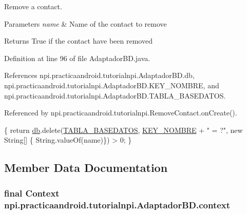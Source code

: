 Remove a contact. 


\begin{DoxyParams}{Parameters}
{\em name} & Name of the contact to remove \\
\hline
\end{DoxyParams}
\begin{DoxyReturn}{Returns}
True if the contact have been removed 
\end{DoxyReturn}


Definition at line 96 of file Adaptador\-B\-D.\-java.



References npi.\-practicaandroid.\-tutorialnpi.\-Adaptador\-B\-D.\-db, npi.\-practicaandroid.\-tutorialnpi.\-Adaptador\-B\-D.\-K\-E\-Y\-\_\-\-N\-O\-M\-B\-R\-E, and npi.\-practicaandroid.\-tutorialnpi.\-Adaptador\-B\-D.\-T\-A\-B\-L\-A\-\_\-\-B\-A\-S\-E\-D\-A\-T\-O\-S.



Referenced by npi.\-practicaandroid.\-tutorialnpi.\-Remove\-Contact.\-on\-Create().


\begin{DoxyCode}
                                                   \{
        \textcolor{keywordflow}{return} \hyperlink{classnpi_1_1practicaandroid_1_1tutorialnpi_1_1_adaptador_b_d_a7bda122c7e3ef7889ebe3f14ee6a6992}{db}.delete(\hyperlink{classnpi_1_1practicaandroid_1_1tutorialnpi_1_1_adaptador_b_d_abbf36d9723f1844372402ae083635e3f}{TABLA\_BASEDATOS}, \hyperlink{classnpi_1_1practicaandroid_1_1tutorialnpi_1_1_adaptador_b_d_aac27fea036b6e589b6a4a8c2e3d5b596}{KEY\_NOMBRE}
       + \textcolor{stringliteral}{" = ?"}, \textcolor{keyword}{new} String[] \{ String.valueOf(name)\}) > 0;        
    \}
\end{DoxyCode}


\subsection{Member Data Documentation}
\hypertarget{classnpi_1_1practicaandroid_1_1tutorialnpi_1_1_adaptador_b_d_a637ed3bd130ac8715ce83832cc24635c}{
\subsubsection[{context}]{\setlength{\rightskip}{0pt plus 5cm}final Context npi.\-practicaandroid.\-tutorialnpi.\-Adaptador\-B\-D.\-context\hspace{0.3cm}{\ttfamily [private]}}}\label{classnpi_1_1practicaandroid_1_1tutorialnpi_1_1_adaptador_b_d_a637ed3bd130ac8715ce83832cc24635c}



